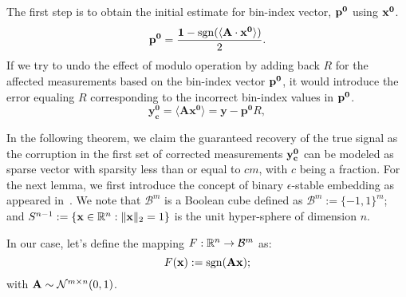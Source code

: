 The first step is to obtain the initial estimate for bin-index vector, $\mathbf{p^0}$ using $\mathbf{x^0}$.
$$
\mathbf{{p}^{0}} = \frac{\mathbf{1}-\mathrm{sgn}(\langle \mathbf{A} \cdot \mathbf{x^0} \rangle)}{2}.
$$
If we try to undo the effect of modulo operation by adding back $R$ for the affected measurements based on the bin-index vector $\mathbf{p^0}$, it would introduce the error equaling $R$ corresponding to the incorrect bin-index values in $\mathbf{p^0}$.
$$
\mathbf{y^0_c} = \langle \mathbf{A}\mathbf{x^{0}} \rangle = \mathbf{y} - \mathbf{p^0}R,
$$

In the following theorem, we claim the guaranteed recovery of the true signal as the corruption in the first set of corrected measurements $\mathbf{y_c^0}$ can be modeled as sparse vector with sparsity less than or equal to $cm$, with $c$ being a fraction.
For the next lemma, we first introduce the concept of binary $\epsilon$-stable embedding as appeared in~\cite{Jacques2013}. We note that $\mathcal{B}^m$ is a Boolean cube defined as $\mathcal{B}^m := \{-1,1\}^m$; and $S^{n-1}:=\{\mathbf{x}\in {\mathbb{R}}^n : \|\mathbf{x}\|_2 = 1\}$ is the unit hyper-sphere of dimension $n$.

In our case, let's define the mapping $F: {\mathbb{R}}^n \rightarrow \mathcal{B}^m$ as:
$$
F(\mathbf{x}):= \mathrm{sgn}(\mathbf{Ax});
$$
with $\mathbf{A} \sim \mathcal{N}^{m \times n}(0,1)$.



